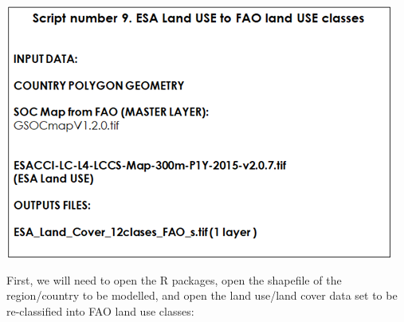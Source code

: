 \documentclass[
  10pt,
  b5paper,
]{book}
\begin{document}
\includegraphics{tables/Table_9.8.png}

First, we will need to open the R packages, open the shapefile of the region/country to be modelled, and open the land use/land cover data set to be re-classified into FAO land use classes:
\end{document}
